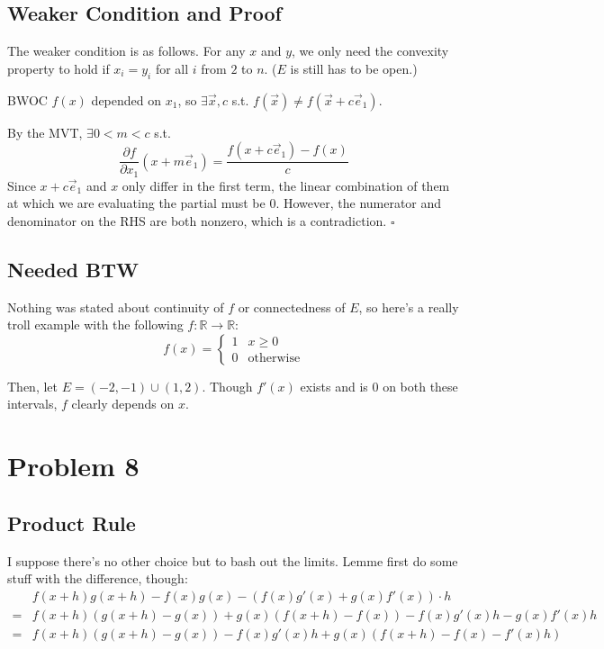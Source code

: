 \documentclass[12pt]{article}
\newcommand{\R}{\mathbb{R}}
\begin{document}
\subsection{Weaker Condition and Proof}

The weaker condition is as follows.
For any $x$ and $y$, we only need the convexity property to hold if
$x_i=y_i$ for all $i$ from $2$ to $n$. ($E$ is still has to be open.)

BWOC $f(x)$ depended on $x_1$, so $\exists \vec{x}, c$ s.t. $f(\vec{x}) \ne f(\vec{x}+c\vec{e}_1)$.

By the MVT, $\exists 0 < m < c$ s.t.
\[\frac{\partial f}{\partial x_1}(x+m\vec{e}_1)=\frac{f(x+c\vec{e}_1)-f(x)}{c}\]
Since $x+c\vec{e}_1$ and $x$ only differ in the first term,
the linear combination of them at which we are evaluating the partial must be $0$.
However, the numerator and denominator on the RHS are both nonzero,
which is a contradiction. $\square$

\subsection{Needed BTW}

Nothing was stated about continuity of $f$ or connectedness of $E$,
so here's a really troll example with the following $f: \R \to \R$:
\[f(x)=\begin{cases}
    1 & x \ge 0          \\
    0 & \text{otherwise}
  \end{cases}\]

Then, let $E=(-2, -1) \cup (1, 2)$.
Though $f'(x)$ exists and is $0$ on both these intervals,
$f$ clearly depends on $x$.

\pagebreak

\section{Problem 8}

\subsection{Product Rule}

I suppose there's no other choice but to bash out the limits.
Lemme first do some stuff with the difference, though:
\begin{align*}
      & f(x+h)g(x+h)-f(x)g(x)-(f(x)g'(x)+g(x)f'(x)) \cdot h         \\
  ={} & f(x+h)(g(x+h)-g(x))+g(x)(f(x+h)-f(x))-f(x)g'(x)h-g(x)f'(x)h \\
  ={} & f(x+h)(g(x+h)-g(x))-f(x)g'(x)h+g(x)(f(x+h)-f(x)-f'(x)h)
\end{align*}
\end{document}
